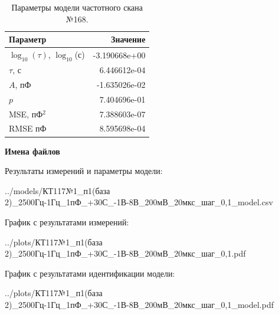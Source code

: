 \begin{table}[!ht]
    \centering
    \caption{Параметры модели частотного скана №168.}
    \begin{tabular}{|l|r|}
        \hline
        Параметр                                       & Значение                  \\ \hline
        $\log_{10}(\tau)$, $\log_{10}$(с)              & -3.190668e+00             \\ \hline
        $\tau$, с                                      & 6.446612e-04              \\ \hline
        $A$, пФ                                        & -1.635026e-02             \\ \hline
        $p$                                            & 7.404696e-01              \\ \hline
        MSE, пФ$^2$                                    & 7.388603e-07              \\ \hline
        RMSE пФ                                        & 8.595698e-04              \\ \hline
    \end{tabular}
    \label{table:frequency_scan_model_168}
\end{table}

\textbf{Имена файлов}

Результаты измерений и параметры модели:

\scriptsize../models/КТ117№1\_п1(база 2)\_2500Гц-1Гц\_1пФ\_+30С\_-1В-8В\_200мВ\_20мкс\_шаг\_0,1\_model.csv
\normalsize

График с результатами измерений:

\scriptsize../plots/КТ117№1\_п1(база 2)\_2500Гц-1Гц\_1пФ\_+30С\_-1В-8В\_200мВ\_20мкс\_шаг\_0,1.pdf
\normalsize

График с результатами идентификации модели:

\scriptsize../plots/КТ117№1\_п1(база 2)\_2500Гц-1Гц\_1пФ\_+30С\_-1В-8В\_200мВ\_20мкс\_шаг\_0,1\_model.pdf
\normalsize

